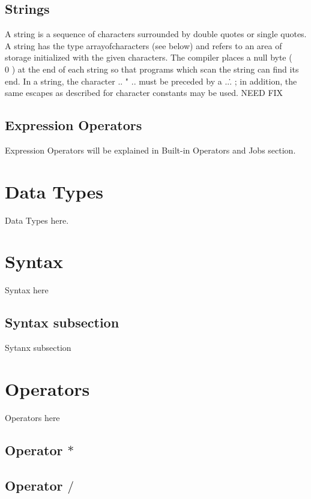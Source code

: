 \documentclass[prodmode,acmtecs]{acmsmall}
\begin{document}
\subsection{Strings}

A string is a sequence of characters surrounded by double quotes or single
quotes.
A string has the type arrayofcharacters
(see below) and refers to an area of storage initialized with the given
characters. The compiler places a null byte ( \\0 ) at the end of each
string so that programs which scan the string can find its end. In a
string, the character ..  " ..  must be preceded by a ..\.. ; in
addition, the same escapes as described for character constants may be used.
NEED FIX

\subsection{Expression Operators}
Expression Operators will be explained in Built-in Operators and Jobs section.

\section{Data Types}

Data Types here.

\section{Syntax}

Syntax here

\subsection{Syntax subsection}

Sytanx subsection

\section{Operators}
Operators here

\subsection{Operator $*$}

\subsection{Operator $/$}
\end{document}
